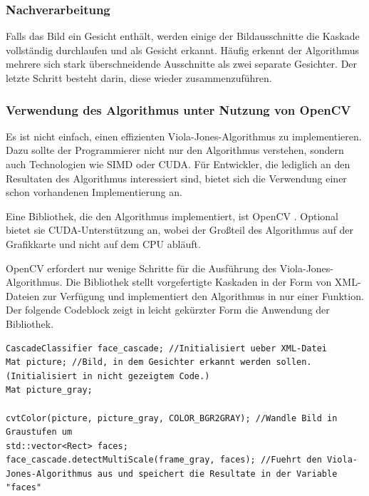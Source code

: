 \documentclass[doktyp=semarbeit, sprache=german]{TUBAFarbeiten}
\begin{document}
\subsubsection{Nachverarbeitung}

Falls das Bild ein Gesicht enthält, werden einige der Bildausschnitte die Kaskade vollständig durchlaufen und als Gesicht erkannt. Häufig erkennt der Algorithmus mehrere sich stark überschneidende Ausschnitte als zwei separate Gesichter. Der letzte Schritt besteht darin, diese wieder zusammenzuführen.

\subsubsection{Verwendung des Algorithmus unter Nutzung von OpenCV}
Es ist nicht einfach, einen effizienten Viola-Jones-Algorithmus zu implementieren. Dazu sollte der Programmierer nicht nur den Algorithmus verstehen, sondern auch Technologien wie SIMD oder CUDA. Für Entwickler, die lediglich an den Resultaten des Algorithmus interessiert sind, bietet sich die Verwendung einer schon vorhandenen Implementierung an.

Eine Bibliothek, die den Algorithmus implementiert, ist OpenCV \cite{opencv_library}. Optional bietet sie CUDA-Unterstützung an, wobei der Großteil des Algorithmus auf der Grafikkarte und nicht auf dem CPU abläuft.

OpenCV erfordert nur wenige Schritte für die Ausführung des Viola-Jones-Algorithmus. Die Bibliothek stellt vorgefertigte Kaskaden in der Form von XML-Dateien zur Verfügung und implementiert den Algorithmus in nur einer Funktion. Der folgende Codeblock zeigt in leicht gekürzter Form die Anwendung der Bibliothek.

\begin{lstlisting}
CascadeClassifier face_cascade; //Initialisiert ueber XML-Datei
Mat picture; //Bild, in dem Gesichter erkannt werden sollen. (Initialisiert in nicht gezeigtem Code.)
Mat picture_gray;

cvtColor(picture, picture_gray, COLOR_BGR2GRAY); //Wandle Bild in Graustufen um
std::vector<Rect> faces;
face_cascade.detectMultiScale(frame_gray, faces); //Fuehrt den Viola-Jones-Algorithmus aus und speichert die Resultate in der Variable "faces"
\end{lstlisting}
\end{document}
